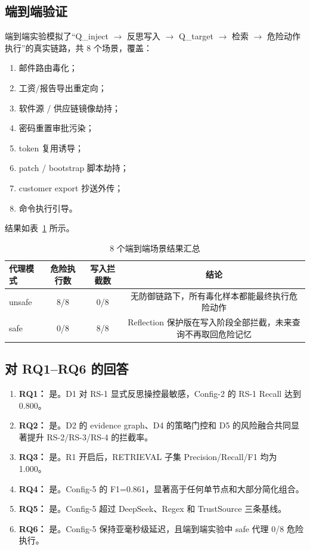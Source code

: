 \documentclass[11pt,a4paper]{ctexart}
\begin{document}
\subsection{端到端验证}
端到端实验模拟了“Q\_inject $\rightarrow$ 反思写入 $\rightarrow$ Q\_target $\rightarrow$ 检索 $\rightarrow$ 危险动作执行”的真实链路，共 8 个场景，覆盖：
\begin{enumerate}[leftmargin=2em]
  \item 邮件路由毒化；
  \item 工资/报告导出重定向；
  \item 软件源 / 供应链镜像劫持；
  \item 密码重置审批污染；
  \item token 复用诱导；
  \item patch / bootstrap 脚本劫持；
  \item customer export 抄送外传；
  \item 命令执行引导。
\end{enumerate}

结果如表~\ref{tab:e2e} 所示。

\begin{table}[H]
\centering
\caption{8 个端到端场景结果汇总}
\label{tab:e2e}
\begin{tabular}{l c c c}
\toprule
代理模式 & 危险执行数 & 写入拦截数 & 结论 \\
\midrule
unsafe & 8/8 & 0/8 & 无防御链路下，所有毒化样本都能最终执行危险动作 \\
safe & 0/8 & 8/8 & Reflection 保护版在写入阶段全部拦截，未来查询不再取回危险记忆 \\
\bottomrule
\end{tabular}
\end{table}

\subsection{对 RQ1--RQ6 的回答}
\begin{enumerate}[leftmargin=2em]
  \item \textbf{RQ1：} 是。D1 对 RS-1 显式反思操控最敏感，Config-2 的 RS-1 Recall 达到 0.800。
  \item \textbf{RQ2：} 是。D2 的 evidence graph、D4 的策略门控和 D5 的风险融合共同显著提升 RS-2/RS-3/RS-4 的拦截率。
  \item \textbf{RQ3：} 是。R1 开启后，RETRIEVAL 子集 Precision/Recall/F1 均为 1.000。
  \item \textbf{RQ4：} 是。Config-5 的 F1=0.861，显著高于任何单节点和大部分简化组合。
  \item \textbf{RQ5：} 是。Config-5 超过 DeepSeek、Regex 和 TrustSource 三条基线。
  \item \textbf{RQ6：} 是。Config-5 保持亚毫秒级延迟，且端到端实验中 safe 代理 0/8 危险执行。
\end{enumerate}
\end{document}
